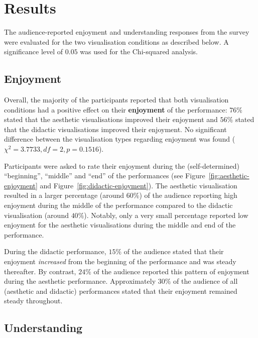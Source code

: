 \section{Results}

The audience-reported enjoyment and understanding responses from the survey were evaluated for the two visualisation conditions as described below. A significance level of $0.05$ was used for the Chi-squared analysis.

\subsection{Enjoyment}



Overall, the majority of the participants reported that both visualisation conditions had a positive effect on their \textbf{enjoyment} of the performance: $76\%$ stated that the aesthetic visualisations improved their enjoyment and $56\%$ stated that the didactic visualisations improved their enjoyment. No significant difference between the visualisation types regarding  enjoyment was found ($\chi^2=3.7733,df=2,p=0.1516$).

Participants were asked to rate their enjoyment during the (self-determined) ``beginning'', ``middle'' and ``end'' of the performances (see Figure~\ref{fig:aesthetic-enjoyment} and Figure~\ref{fig:didactic-enjoyment}). The aesthetic visualisation resulted in a larger
percentage (around $60\%$) of the audience reporting high enjoyment during the middle of the performance compared to the didactic visualisation (around $40\%$). Notably, only a very small percentage reported low enjoyment for the aesthetic visualisations during the middle and end of the performance.

During the didactic performance, $15\%$ of the audience stated that their enjoyment \emph{increased} from the beginning of the performance and was steady thereafter. By contrast, $24\%$ of the audience reported this pattern of enjoyment during the aesthetic performance. Approximately $30\%$ of the audience of all (aesthetic and didactic) performances stated that their enjoyment remained steady throughout.

\subsection{Understanding}



